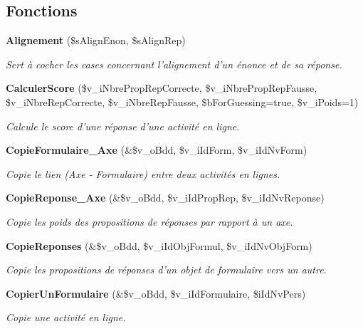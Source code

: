 \subsection*{Fonctions}
\begin{CompactItemize}
\item 
{\bf Alignement} (\$sAlignEnon, \$sAlignRep)
\begin{CompactList}\small\item\em Sert à cocher les cases concernant l'alignement d'un énonce et de sa réponse. \item\end{CompactList}\item 
{\bf CalculerScore} (\$v\_\-iNbrePropRepCorrecte, \$v\_\-iNbrePropRepFausse, \$v\_\-iNbreRepCorrecte, \$v\_\-iNbreRepFausse, \$bForGuessing=true, \$v\_\-iPoids=1)
\begin{CompactList}\small\item\em Calcule le score d'une réponse d'une activité en ligne. \item\end{CompactList}\item 
{\bf CopieFormulaire\_\-Axe} (\&\$v\_\-oBdd, \$v\_\-iIdForm, \$v\_\-iIdNvForm)
\begin{CompactList}\small\item\em Copie le lien (Axe - Formulaire) entre deux activités en lignes. \item\end{CompactList}\item 
{\bf CopieReponse\_\-Axe} (\&\$v\_\-oBdd, \$v\_\-iIdPropRep, \$v\_\-iIdNvReponse)
\begin{CompactList}\small\item\em Copie les poids des propositions de réponses par rapport à un axe. \item\end{CompactList}\item 
{\bf CopieReponses} (\&\$v\_\-oBdd, \$v\_\-iIdObjFormul, \$v\_\-iIdNvObjForm)
\begin{CompactList}\small\item\em Copie les propositions de réponses d'un objet de formulaire vers un autre. \item\end{CompactList}\item 
{\bf CopierUnFormulaire} (\&\$v\_\-oBdd, \$v\_\-iIdFormulaire, \$iIdNvPers)
\begin{CompactList}\small\item\em Copie une activité en ligne. \item\end{CompactList}\item 

\end{CompactItemize}
